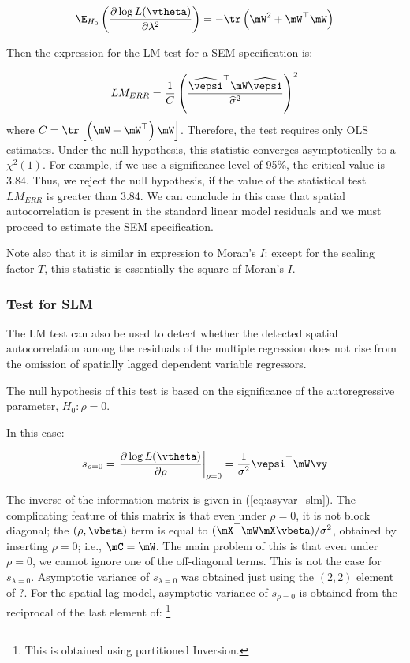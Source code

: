 \documentclass[english,12pt]{book}\usepackage[]{graphicx}\usepackage[]{xcolor}
\begin{document}
\begin{equation}
\E_{H_0}\left(\frac{\partial \log L(\vtheta)}{\partial \lambda^2}\right) = -\tr\left(\mW^2 + \mW^\top\mW\right)
\end{equation}



Then the expression for the LM test for a SEM specification is:

\begin{equation}
LM_{ERR} = \frac{1}{C}\left(\frac{\widehat{\vepsi}^\top\mW\widehat{\vepsi}}{\widehat{\sigma}^2}\right)^2
\end{equation}
%
where $C = \tr\left[\left(\mW + \mW^\top\right)\mW\right]$. Therefore, the test requires only OLS estimates.  Under the null hypothesis, this statistic converges asymptotically to a $\chi^2(1)$. For example, if we use a significance level of 95\%, the critical value is 3.84. Thus, we reject the null hypothesis, if the value of the statistical test $LM_{ERR}$ is greater than 3.84. We can conclude in this case that spatial autocorrelation is present in the standard linear model residuals and we must proceed to estimate the SEM specification. 

Note also that it is similar in expression to Moran's $I$: except for the scaling factor $T$, this statistic is essentially the square of Moran's $I$. 



\subsubsection{Test for SLM}

The LM test can also be used to detect whether the detected spatial autocorrelation among the residuals of the multiple regression does not rise from the omission of spatially lagged dependent variable regressors. 

The null hypothesis of this test is based on the significance of the autoregressive parameter, $H_0:\rho = 0$.

In this case:

\begin{equation}
s_{\rho = 0}= \left.\frac{\partial \log L(\vtheta)}{\partial \rho}\right|_{\rho = 0} = \frac{1}{\sigma^2}\vepsi^\top\mW\vy
\end{equation}
%

The inverse of the information matrix is given in (\ref{eq:asyvar_slm}). The complicating feature of this matrix is that even under $\rho = 0$, it is not block diagonal; the $(\rho, \vbeta)$ term is equal to $(\mX^\top\mW\mX\vbeta) / \sigma^2$, obtained by inserting $\rho = 0$; i.e., $\mC = \mW$. The main problem of this is that even under $\rho = 0$, we cannot ignore one of the off-diagonal terms.  This is not the case for $s_{\lambda = 0}$. Asymptotic variance of $s_{\lambda = 0}$ was obtained just using the $(2, 2)$ element of ?. For the spatial lag model, asymptotic variance of $s_{\rho = 0}$ is obtained from the reciprocal of the last  element of: \footnote{This is obtained using partitioned Inversion.}  
\end{document}
